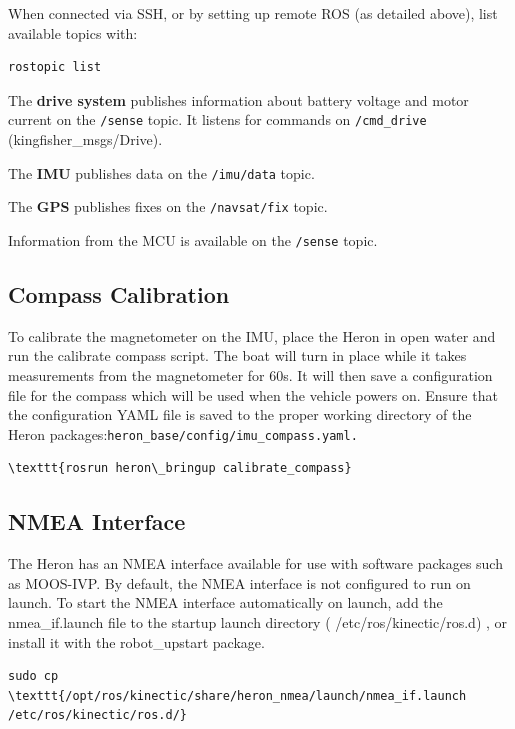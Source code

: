 \documentclass[]{clearpath-latex/clearpath-manual}
\begin{document}
When connected via SSH, or by setting up remote ROS (as detailed above), list available topics with:

\begin{lstlisting}
rostopic list
\end{lstlisting}

The \textbf{drive system} publishes information about battery voltage and motor current on the \lstinline{/sense} topic. It listens for commands on \lstinline{/cmd_drive} (kingfisher\_msgs/Drive).

The \textbf{IMU} publishes data on the \lstinline{/imu/data} topic.

The \textbf{GPS} publishes fixes on the \lstinline{/navsat/fix} topic.

Information from the MCU is available on the \lstinline{/sense} topic.

\subsection{Compass Calibration}

To calibrate the magnetometer on the IMU, place the Heron in open water and run the calibrate compass script. The boat will turn in place while it takes measurements from the magnetometer for 60s. It will then save a configuration file for the compass which will be used when the vehicle powers on. Ensure that the configuration YAML file is saved to the proper working directory of the Heron packages:\texttt{heron\_base/config/imu\_compass.yaml.}

\begin{lstlisting}
\texttt{rosrun heron\_bringup calibrate_compass}
\end{lstlisting}

\subsection{NMEA Interface}

The Heron has an NMEA interface available for use with software packages such as MOOS-IVP. By default, the NMEA interface is not configured to run on launch. To start the NMEA interface automatically on launch, add the nmea\_if.launch file to the startup launch directory ( /etc/ros/kinectic/ros.d) , or install it with the robot\_upstart package.
\begin{lstlisting}
sudo cp \texttt{/opt/ros/kinectic/share/heron_nmea/launch/nmea_if.launch /etc/ros/kinectic/ros.d/}
\end{lstlisting}
\end{document}
